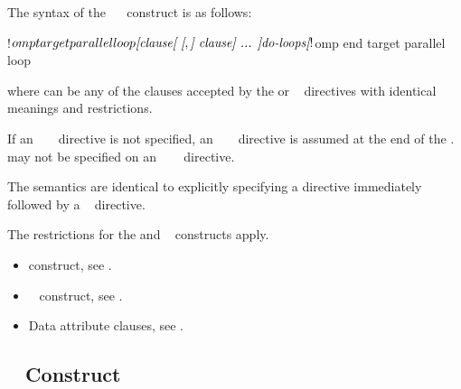 \begin{fortranspecific}
The syntax of the ~~ construct is as follows:

\begin{ompfPragma}
!$omp target parallel loop \plc{[clause[ [},\plc{] clause] ... ]}
    \plc{do-loops}
\plc{[}!$omp end target parallel loop\plc{]}
\end{ompfPragma}

where  can be any of the clauses accepted by the  or ~
directives with identical meanings and restrictions.

If an ~ ~ directive is not specified, an
~ ~ directive is assumed at the end of the
.
 may not be specified on an ~~~ directive.
\end{fortranspecific}

\descr
The semantics are identical to explicitly specifying a  directive immediately
followed by a ~ directive.

\restrictions
The restrictions for the  and ~ constructs apply.

\crossreferences
\begin{itemize}
\item {} construct, see .

\item {}~ construct, see
.

\item Data attribute clauses, see .
\end{itemize}









\subsection{~ Construct}
\label{subsec:target simd Construct}

